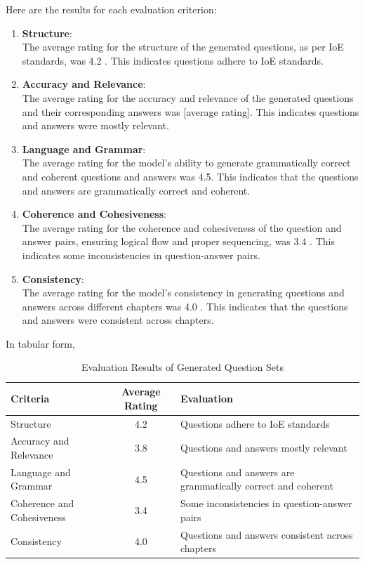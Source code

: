 \documentclass[12pt]{report}
\begin{document}
Here are the results for each evaluation criterion:
\begin{enumerate}
    \item {\bfseries Structure}: \\ 
    The average rating for the structure of the generated questions, as per IoE standards, was 4.2 . This indicates questions adhere to IoE standards.
    \item {\bfseries Accuracy and Relevance}:\\ 
    The average rating for the accuracy and relevance of the generated questions and their corresponding answers was [average rating]. This indicates questions and answers were mostly relevant.
    \item {\bfseries Language and Grammar}:\\ 
    The average rating for the model's ability to generate grammatically correct and coherent questions and answers was 4.5. This indicates that the questions and answers are grammatically correct and coherent.
    \item {\bfseries Coherence and Cohesiveness}:\\ 
    The average rating for the coherence and cohesiveness of the question and answer pairs, ensuring logical flow and proper sequencing, was 3.4 . This indicates some inconsistencies in question-answer pairs.
    \item {\bfseries Consistency}:\\ The average rating for the model's consistency in generating questions and answers across different chapters was 4.0 . This indicates that the questions and answers were consistent across chapters.
\end{enumerate}
In tabular form,
\begin{table}[ht]
\centering
\caption{Evaluation Results of Generated Question Sets}
\begin{tabular}{|l|c|p{6cm}|}
\hline
\textbf{Criteria} & \textbf{Average Rating} & \textbf{Evaluation} \\
\hline
Structure & 4.2 & Questions adhere to IoE standards \\
\hline
Accuracy and Relevance & 3.8 & Questions and answers mostly relevant \\
\hline
Language and Grammar & 4.5 & Questions and answers are grammatically correct and coherent \\
\hline
Coherence and Cohesiveness & 3.4 & Some inconsistencies in question-answer pairs \\
\hline
Consistency & 4.0 & Questions and answers consistent across chapters \\
\hline
\end{tabular}
\end{table}
\end{document}
